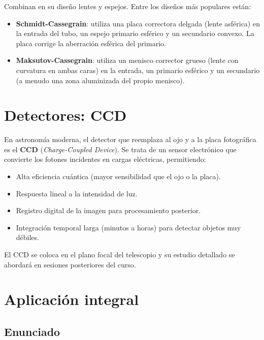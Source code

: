 Combinan en su diseño lentes y espejos. Entre los diseños más populares están:

\begin{itemize}
    \item \textbf{Schmidt-Cassegrain}: utiliza una placa correctora delgada (lente asférica) en la entrada del tubo, un espejo primario esférico y un secundario convexo. La placa corrige la aberración esférica del primario.
    \item \textbf{Maksutov-Cassegrain}: utiliza un menisco corrector grueso (lente con curvatura en ambas caras) en la entrada, un primario esférico y un secundario (a menudo una zona aluminizada del propio menisco).
\end{itemize}





\section{Detectores: CCD}

En astronomía moderna, el detector que reemplaza al ojo y a la placa fotográfica es el \textbf{CCD} (\textit{Charge-Coupled Device}). Se trata de un sensor electrónico que convierte los fotones incidentes en cargas eléctricas, permitiendo:

\begin{itemize}
    \item Alta eficiencia cuántica (mayor sensibilidad que el ojo o la placa).
    \item Respuesta lineal a la intensidad de luz.
    \item Registro digital de la imagen para procesamiento posterior.
    \item Integración temporal larga (minutos a horas) para detectar objetos muy débiles.
\end{itemize}

El CCD se coloca en el plano focal del telescopio y su estudio detallado se abordará en sesiones posteriores del curso.

\section{Aplicación integral}

\subsection*{Enunciado}

